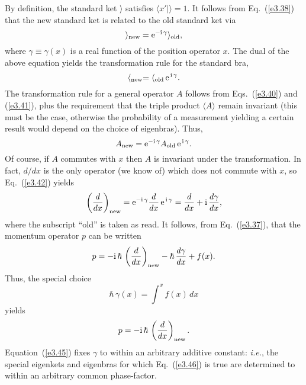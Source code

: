 By definition, the standard ket $\rangle$ satisfies $\langle x'|\rangle = 1$.
It follows from Eq.~(\ref{e3.38}) that the new standard ket is related to the
old standard ket via
\begin{equation}\label{e3.40}
\rangle_{\rm new} = {\rm e}^{-{\rm i}\, \gamma} \rangle_{\rm old},
\end{equation}
where $\gamma\equiv \gamma(x)$ is a real function of the position operator $x$. 
The dual of the above equation yields the transformation rule for
the standard bra,
\begin{equation}\label{e3.41}
\langle_{\rm new} = \langle_{\rm old} \,{\rm e}^{\,{\rm i}\, \gamma}.
\end{equation}
The transformation rule for a general operator $A$ follows from Eqs.~(\ref{e3.40}) and (\ref{e3.41}),
plus the requirement that the triple product $\langle A\rangle$ remain
invariant (this must be the case, otherwise the probability of a measurement
yielding a certain result would depend on the choice of eigenbras). Thus,
\begin{equation}\label{e3.42}
A_{\rm new} = {\rm e}^{-{\rm i}\,\gamma} A_{\rm old}\,{\rm e}^{\,{\rm i}\,\gamma}.
\end{equation}
Of course, if $A$ commutes with $x$ then $A$ is invariant under the transformation.
In fact, $d/dx$ is the only operator (we know of) which does not commute
with $x$, so Eq.~(\ref{e3.42}) yields
\begin{equation}
\left(\frac{d}{dx}\right)_{\rm new} =  {\rm e}^{-{\rm i}\,\gamma}\frac{d}{dx}\,{\rm e}^{\,{\rm i}\,\gamma} = \frac{d}{dx} + {\rm i}\, \frac{d\gamma}{dx},
\end{equation}
where the subscript ``old'' is taken as read. It follows, from Eq.~(\ref{e3.37}), that
the momentum operator $p$ can be written
\begin{equation}
p = -{\rm i} \,\hbar\,\left(\frac{d}{dx}\right)_{\rm new} - \hbar\,\frac{d\gamma}{dx} + f(x).
\end{equation}
Thus, the special choice
\begin{equation}\label{e3.45}
\hbar\,\gamma(x) = \int^x f(x)\,dx
\end{equation}
 yields
\begin{equation}\label{e3.46}
p =  -{\rm i} \,\hbar\,\left(\frac{d}{dx}\right)_{\rm new}.
\end{equation}
Equation~(\ref{e3.45}) fixes $\gamma$ to
within an arbitrary additive constant: {\em i.e.}, the special eigenkets and eigenbras 
for which Eq.~(\ref{e3.46}) is true are determined to within an arbitrary common phase-factor. 

